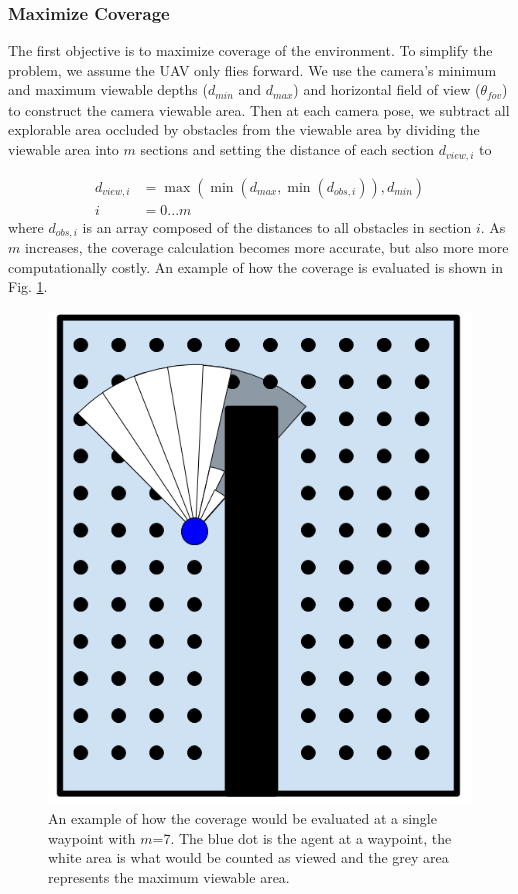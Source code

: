 \documentclass[letterpaper, 10 pt, conference]{ieeeconf}  %
\begin{document}
\subsubsection{Maximize Coverage}

The first objective is to maximize coverage of the environment.  To simplify the problem, we assume the UAV only flies forward. We use the camera's minimum and maximum viewable depths ($d_{\mathit{min}}$ and $d_{\mathit{max}}$) and horizontal field of view ($\theta_{\mathit{fov}}$) to construct the camera viewable area. Then at each camera pose, we subtract all explorable area occluded by obstacles from the viewable area by dividing the viewable area into $m$ sections and setting the distance of each section $d_{\mathit{view},i}$ to

\begin{align}
  d_{\mathit{view},i} &= \max(\min(d_{\mathit{max}}, \min(d_{\mathit{obs},i})),d_{\mathit{min}}) \\
  i &= 0...m \nonumber
\end{align}
%
where $d_{\mathit{obs},i}$ is an array composed of the distances to all obstacles in section $i$. As $m$ increases, the coverage calculation becomes more accurate, but also more more computationally costly. An example of how the coverage is evaluated is shown in Fig. \ref{fig:coverage_sections}.

\begin{figure}
\centering
\includegraphics[width=0.5\linewidth]{figures/coverage_sections.png}
\caption{An example of how the coverage would be evaluated at a single waypoint with $m$=7. The blue dot is the agent at a waypoint, the white area is what would be counted as viewed and the grey area represents the maximum viewable area.}
\label{fig:coverage_sections}
\end{figure}
\end{document}
